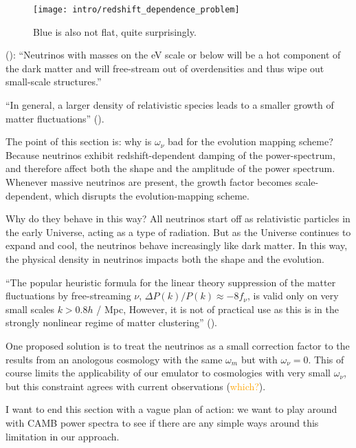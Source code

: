 \begin{figure}[htb]
  \centering
  \texttt{[image: intro/redshift\_dependence\_problem]}
  \caption[Redshift Dependence of Neutrino Impact]{Blue is also not flat,
  	quite surprisingly.}
  \label{fig: neutrinos_and_redshift}
\end{figure}

(): ``Neutrinos with masses on the eV scale or below will be a
hot component of the dark matter and will free-stream out of overdensities and
thus wipe out small-scale structures.''

``In general, a larger density of relativistic species leads to a smaller
growth of matter fluctuations'' ().

The point of this section is: why is $\omega_\nu$ bad for the
evolution mapping scheme? Because neutrinos exhibit redshift-dependent
damping of the power-spectrum, and therefore affect both the shape and the
amplitude of the power spectrum. Whenever massive neutrinos are present,
the growth factor becomes scale-dependent, which disrupts the
evolution-mapping scheme.

Why do they behave in this way? All neutrinos start off as
relativistic particles in the early Universe, acting as a type of radiation.
But as the Universe continues to expand and cool, the neutrinos behave
increasingly like dark matter.
In this way, the physical density in neutrinos impacts both the shape and the
evolution.

``The popular heuristic formula for the linear theory suppression of the matter
fluctuations by free-streaming $\nu$, $\Delta P(k) / P(k) \approx -8 f_\nu$, is
valid only on very small scales $k > 0.8 h$ / Mpc, However, it is not of
practical use as this is in the strongly nonlinear regime of matter
clustering'' ().

One proposed solution is to treat the neutrinos as a small correction factor
to the results from an anologous cosmology with the same $\omega_m$ but with
$\omega_\nu = 0$. This of course limits the applicability of our emulator to
cosmologies with very small $\omega_\nu$, but this constraint agrees with
current observations (\textcolor{orange}{which?}).

I want to end this section with a vague plan of action: we want to play around with CAMB power spectra to see if there are any simple ways around this limitation in our approach.



